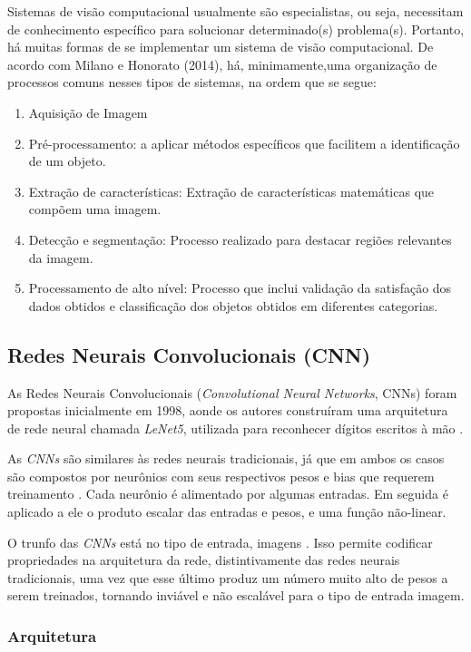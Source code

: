Sistemas de visão computacional usualmente são especialistas, ou seja, necessitam de conhecimento específico para solucionar determinado(s) problema(s). Portanto, há muitas formas de se implementar um sistema de visão computacional. De acordo com Milano e Honorato (2014)\nocite{de2014visao}, há, minimamente,uma organização de processos comuns nesses tipos de sistemas, na ordem que se segue:

\begin{enumerate}
    \item Aquisição de Imagem
    \item Pré-processamento:  a aplicar métodos específicos que facilitem a identificação de um objeto.
    \item Extração de características: Extração de características matemáticas que compõem uma imagem.
    \item Detecção e segmentação: Processo realizado para destacar regiões relevantes da imagem.
    \item Processamento de alto nível: Processo que inclui validação da satisfação dos dados obtidos e classificação dos objetos obtidos em diferentes categorias.
\end{enumerate}

\subsection{Redes Neurais Convolucionais (CNN)}
As Redes Neurais Convolucionais (\textit{Convolutional Neural Networks}, CNNs) foram propostas inicialmente em 1998, aonde os autores construíram uma arquitetura de rede neural chamada \textit{LeNet5}, utilizada para reconhecer dígitos escritos à mão \cite{lecun1998gradient}.

As \textit{CNNs} são similares às redes neurais tradicionais, já que em ambos os casos são compostos por neurônios com seus respectivos pesos e bias que requerem treinamento \cite{haykin2007redes}. Cada neurônio é alimentado por algumas entradas. Em seguida é aplicado a ele o produto escalar das entradas e pesos, e uma função não-linear. 

O trunfo das \textit{CNNs} está no tipo de entrada, imagens \cite{santos2018identificaccao}. Isso permite codificar propriedades na arquitetura da rede, distintivamente das redes neurais tradicionais, uma vez que esse último produz um número muito alto de pesos a serem treinados, tornando inviável e não escalável para o tipo de entrada imagem.

\subsubsection{Arquitetura}

